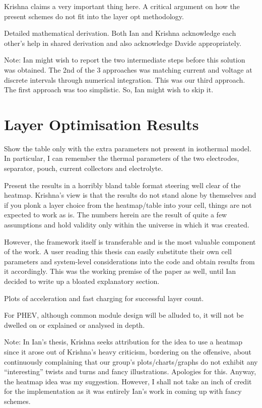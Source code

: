 Krishna claims a very important thing here. A critical argument on how the
present schemes do not fit into the layer opt methodology.

Detailed mathematical derivation. Both Ian and Krishna acknowledge each other's
help in shared derivation and also acknowledge Davide appropriately.

Note: Ian might wish to report the two intermediate steps before this solution
was obtained. The 2nd of the 3 approaches was matching current and voltage at
discrete intervals through numerical integration. This was our third approach.
The first approach was too simplistic. So, Ian might wish to skip it.


\section{Layer Optimisation Results}

Show the table only with the extra parameters not present in isothermal model.
In particular, I can remember the thermal parameters of the two electrodes,
separator, pouch, current collectors and electrolyte.

Present the results in a horribly bland table format steering well clear of the
heatmap. Krishna's view is that the results do not stand alone by themselves and
if you plonk a layer choice from the heatmap/table into your cell, things are
not expected to work as is. The numbers herein are the result of quite a few
assumptions and hold validity only within the universe in which it was created.

However, the framework itself is transferable and is the most valuable component
of the work. A user reading this thesis can easily substitute their own cell
parameters and system-level considerations into the code and obtain results from
it accordingly. This was the working premise of the paper as well, until Ian
decided to write up a bloated explanatory section.

Plots of acceleration and fast charging for successful layer count.

For PHEV, although common module design will be alluded to, it will not be dwelled on or explained or analysed in depth.


Note: In Ian's thesis, Krishna seeks attribution for the idea to use a heatmap
since it arose out of Krishna's heavy criticism, bordering on the offensive,
about continuously complaining that our group's plots/charts/graphs do not
exhibit any ``interesting'' twists and turns and fancy illustrations. Apologies
for this. Anyway, the heatmap idea was my suggestion. However, I shall not take
an inch of credit for the implementation as it was entirely Ian's work in coming
up with fancy schemes.

